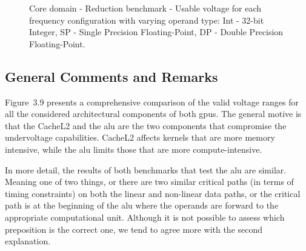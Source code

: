 \begin{figure}[!htb]
    \centering
    \begin{subfigmatrix}{2}
      \label{fig:Reduction_guardband}
    \end{subfigmatrix}
    \caption{Core domain - Reduction benchmark - Usable voltage for each frequency configuration with varying operand type: Int - 32-bit Integer, SP - Single Precision Floating-Point, DP - Double Precision Floating-Point.}
\end{figure}


\subsection{General Comments and Remarks}


Figure~3.9
presents a comprehensive comparison of the valid voltage ranges for all the considered architectural components of both \acrshort{gpu}s. 
The general motive is that the CacheL2 and the \acrshort{alu} are the two components that compromise the undervoltage capabilities. CacheL2 affects kernels that are more memory intensive, while the \acrshort{alu} limits those that are more compute-intensive. 

In more detail, the results of both benchmarks that test the \acrshort{alu} are similar. Meaning one of two things, or there are two similar critical paths (in terms of timing constraints) on both the linear and non-linear data paths, or the critical path is at the beginning of the  \acrshort{alu} where the operands are forward to the appropriate computational unit. Although it is not possible to assess which preposition is the correct one, we tend to agree more with the second explanation.

